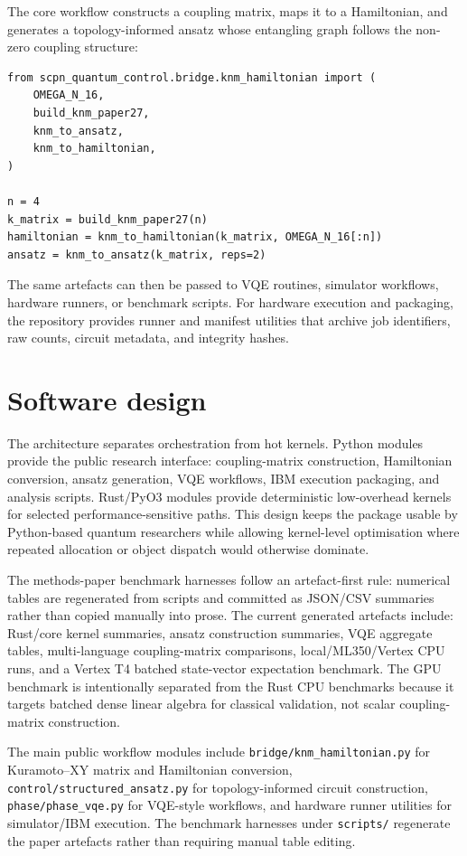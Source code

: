 \documentclass[11pt]{article}
\begin{document}
The core workflow constructs a coupling matrix, maps it to a Hamiltonian, and
generates a topology-informed ansatz whose entangling graph follows the
non-zero coupling structure:

\begin{verbatim}
from scpn_quantum_control.bridge.knm_hamiltonian import (
    OMEGA_N_16,
    build_knm_paper27,
    knm_to_ansatz,
    knm_to_hamiltonian,
)

n = 4
k_matrix = build_knm_paper27(n)
hamiltonian = knm_to_hamiltonian(k_matrix, OMEGA_N_16[:n])
ansatz = knm_to_ansatz(k_matrix, reps=2)
\end{verbatim}

The same artefacts can then be passed to VQE routines, simulator workflows,
hardware runners, or benchmark scripts. For hardware execution and packaging,
the repository provides runner and manifest utilities that archive job
identifiers, raw counts, circuit metadata, and integrity hashes.

\section*{Software design}

The architecture separates orchestration from hot kernels. Python modules
provide the public research interface: coupling-matrix construction,
Hamiltonian conversion, ansatz generation, VQE workflows, IBM execution
packaging, and analysis scripts. Rust/PyO3 modules provide deterministic
low-overhead kernels for selected performance-sensitive paths. This design
keeps the package usable by Python-based quantum researchers while allowing
kernel-level optimisation where repeated allocation or object dispatch would
otherwise dominate.

The methods-paper benchmark harnesses follow an artefact-first rule: numerical
tables are regenerated from scripts and committed as JSON/CSV summaries rather
than copied manually into prose. The current generated artefacts include:
Rust/core kernel summaries, ansatz construction summaries, VQE aggregate
tables, multi-language coupling-matrix comparisons, local/ML350/Vertex CPU
runs, and a Vertex T4 batched state-vector expectation benchmark. The GPU
benchmark is intentionally separated from the Rust CPU benchmarks because it
targets batched dense linear algebra for classical validation, not scalar
coupling-matrix construction.

The main public workflow modules include \texttt{bridge/knm\_hamiltonian.py}
for Kuramoto--XY matrix and Hamiltonian conversion,
\texttt{control/structured\_ansatz.py} for topology-informed circuit
construction, \texttt{phase/phase\_vqe.py} for VQE-style workflows, and
hardware runner utilities for simulator/IBM execution. The benchmark harnesses
under \texttt{scripts/} regenerate the paper artefacts rather than requiring
manual table editing.
\end{document}
